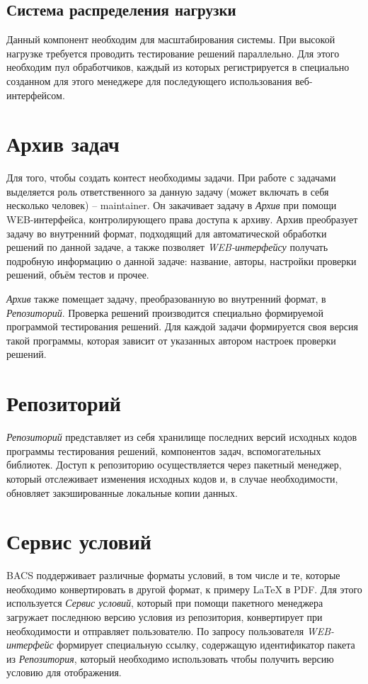 \subsection{Система распределения нагрузки}
Данный компонент необходим для масштабирования системы.
При высокой нагрузке требуется проводить тестирование решений параллельно.
Для этого необходим пул обработчиков, каждый из которых регистрируется в специально
созданном для этого менеджере для последующего использования веб-интерфейсом.

\section{Архив задач}
Для того, чтобы создать контест необходимы задачи.
При работе с задачами выделяется роль ответственного за данную задачу (может включать в себя
несколько человек) -- maintainer. Он закачивает задачу в \textit{Архив} при помощи WEB-интерфейса,
контролирующего права доступа к архиву. Архив преобразует задачу во внутренний формат,
подходящий для автоматической обработки решений по данной задаче, а также позволяет
\textit{WEB-интерфейсу} получать подробную информацию о данной задаче:
название, авторы, настройки проверки решений, объём тестов и прочее.

\textit{Архив} также помещает задачу, преобразованную во внутренний формат, в \textit{Репозиторий}.
Проверка решений производится специально формируемой программой тестирования решений.
Для каждой задачи формируется своя версия такой программы, которая зависит
от указанных автором настроек проверки решений.

\section{Репозиторий}
\textit{Репозиторий} представляет из себя хранилище последних версий исходных кодов
программы тестирования решений, компонентов задач, вспомогательных библиотек.
Доступ к репозиторию осуществляется через пакетный менеджер,
который отслеживает изменения исходных кодов и, в случае необходимости,
обновляет закэшированные локальные копии данных.

\section{Сервис условий}
BACS поддерживает различные форматы условий, в том числе и те, которые необходимо
конвертировать в другой формат, к примеру LaTeX в PDF. Для этого используется
\textit{Сервис условий}, который при помощи пакетного менеджера загружает последнюю
версию условия из репозитория, конвертирует при необходимости
и отправляет пользователю. По запросу пользователя \textit{WEB-интерфейс}
формирует специальную ссылку, содержащую идентификатор пакета из \textit{Репозитория},
который необходимо использовать чтобы получить версию условию для отображения.

